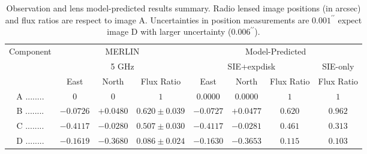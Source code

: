 \documentclass[useAMS,usenatbib]{mnras}
\begin{document}

\begin{table}
\centering
 \begin{minipage}{140mm}
  \caption{Observation and lens model-predicted results summary. Radio lensed image positions \citep{Marlow99} (in arcsec) and flux ratios \citep{K03} are respect to image A. Uncertainties in position measurements are $0.001^ {\prime \prime}$ expect image D with larger uncertainty ($0.006^ {\prime \prime}$). }
  \begin{tabular}{@{}cccccccc}
\hline

Component	&\multicolumn{3}{c}{MERLIN} 	 & \multicolumn{4}{c}{Model-Predicted} \\
					&\multicolumn{3}{c}{5 GHz}		&	\multicolumn{3}{c}{SIE+expdisk} & SIE-only 	\\
					 &East &North & Flux Ratio &East 		&North & Flux Ratio &Flux Ratio \\ 
\hline
A ........ &$0$    		&$0$		&   $1$ &$0.0000$ &$0.0000$ &  $1$ & $1$\\  
B ........ &$-0.0726$ 	&$+0.0480 $	& $0.620 \pm 0.039 $  &$-0.0727$ &$+0.0477$ & $0.620$ & $0.962 $ \\  
C ........ &$-0.4117$  &$-0.0280$	& $0.507\pm 0.030$ &$-0.4117$ &$-0.0281$   & $ 0.461 $ & $0.313 $\\  
D ........ &$-0.1619$  &$-0.3680$	& $0.086 \pm 0.024$  &$-0.1630$ &$-0.3653$  & $0.115$ & $0.103 $\\  
\hline
\end{tabular}

\end{minipage}
\end{table}
\end{document}
